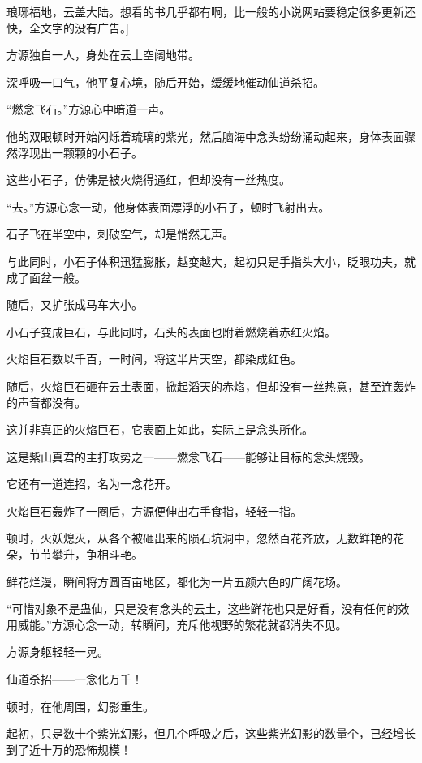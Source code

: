 
\begin{this_body}

琅琊福地，云盖大陆。想看的书几乎都有啊，比一般的小说网站要稳定很多更新还快，全文字的没有广告。]

方源独自一人，身处在云土空阔地带。

深呼吸一口气，他平复心境，随后开始，缓缓地催动仙道杀招。

“燃念飞石。”方源心中暗道一声。

他的双眼顿时开始闪烁着琉璃的紫光，然后脑海中念头纷纷涌动起来，身体表面骤然浮现出一颗颗的小石子。

这些小石子，仿佛是被火烧得通红，但却没有一丝热度。

“去。”方源心念一动，他身体表面漂浮的小石子，顿时飞射出去。

石子飞在半空中，刺破空气，却是悄然无声。

与此同时，小石子体积迅猛膨胀，越变越大，起初只是手指头大小，眨眼功夫，就成了面盆一般。

随后，又扩张成马车大小。

小石子变成巨石，与此同时，石头的表面也附着燃烧着赤红火焰。

火焰巨石数以千百，一时间，将这半片天空，都染成红色。

随后，火焰巨石砸在云土表面，掀起滔天的赤焰，但却没有一丝热意，甚至连轰炸的声音都没有。

这并非真正的火焰巨石，它表面上如此，实际上是念头所化。

这是紫山真君的主打攻势之一——燃念飞石——能够让目标的念头烧毁。

它还有一道连招，名为一念花开。

火焰巨石轰炸了一圈后，方源便伸出右手食指，轻轻一指。

顿时，火妖熄灭，从各个被砸出来的陨石坑洞中，忽然百花齐放，无数鲜艳的花朵，节节攀升，争相斗艳。

鲜花烂漫，瞬间将方圆百亩地区，都化为一片五颜六色的广阔花场。

“可惜对象不是蛊仙，只是没有念头的云土，这些鲜花也只是好看，没有任何的效用威能。”方源心念一动，转瞬间，充斥他视野的繁花就都消失不见。

方源身躯轻轻一晃。

仙道杀招——一念化万千！

顿时，在他周围，幻影重生。

起初，只是数十个紫光幻影，但几个呼吸之后，这些紫光幻影的数量个，已经增长到了近十万的恐怖规模！


\end{this_body}
